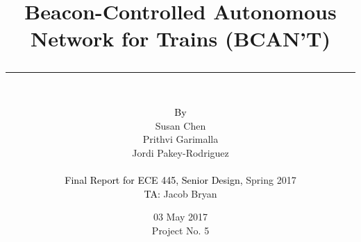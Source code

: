 \documentclass[openbib,letterpaper,10pt]{article}
\author{\vspace{0.5in}\\
	\textcolor{black}{By}\\
	#1
	\vspace{0.8in}\\
	\textcolor{black}{Final Report for ECE 445, Senior Design,} #2\\
	\textcolor{black}{TA:} #3
	\vspace{0.3in}}
\newcommand{\thetitle}[1]{\title{\begin{Huge}{\bf #1}\end{Huge} \color{subtitlecolor}\rule[25pt]{\textwidth}{1pt}}}
\newcommand{\theauthor}[3]{
	\author{\vspace{0.5in}\\
	\textcolor{black}{By}\\
	#1
	\vspace{0.8in}\\
	\textcolor{black}{Final Report for ECE 445, Senior Design,} #2\\
	\textcolor{black}{TA:} #3
	\vspace{0.3in}}
}
\begin{document}
\pagestyle{empty}
\doublespacing

\thetitle{Beacon-Controlled Autonomous Network for Trains (BCAN’T)}

\theauthor{
	Susan Chen\\
	Prithvi Garimalla\\
	Jordi Pakey-Rodriguez
}
{ %
	Spring 2017
}
{ %
	Jacob Bryan
}

\date{
03 May 2017\\
Project No. 5
\clearpage
}
\end{document}
